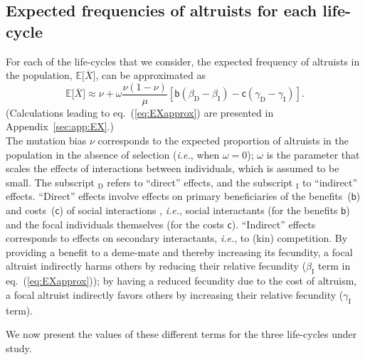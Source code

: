 \documentclass[11pt, letterpaper]{article}
\renewcommand{\eqref}[1]{\textup{{\normalfont eq.~(\ref{#1}}\normalfont)}}
\newcommand{\ie}{\textit{i.e.}}
\newcommand{\Esp}[1]{\mathbb{E}\big[ #1\big]}%
\newcommand{\appname}[0]{Appendix}
\newcommand{\bb}{\mathsf{b}}
\newcommand{\cc}{\mathsf{c}}
\newcommand{\direct}{\mathrm{D}}
\newcommand{\indirect}{\mathrm{I}}
\newcommand{\mutbias}{\nu}
\begin{document}
\clearpage
\subsection{Expected frequencies of altruists for each life-cycle}

For each of the life-cycles that we consider, the expected frequency of altruists in the population, $\Esp{\overline{X}}$, can be approximated as
\begin{equation}\label{eq:EXapprox}
\Esp{\overline{X}} \approx \mutbias + \omega \frac{\mutbias (1-\mutbias)}{\mu} \left[ \bb \left( \beta_{\direct} - \beta_{\indirect} \right) - \cc \left( \gamma_{\direct} - \gamma_{\indirect} \right) \right].
\end{equation}
(Calculations leading to \eqref{eq:EXapprox} are presented in  \appname~\ref{sec:app:EX}.)\\
The mutation bias $\mutbias$ corresponds to the expected proportion of altruists in the population in the absence of selection (\ie, when $\omega = 0$); $\omega$ is the parameter that scales the effects of interactions between individuals, which is assumed to be small. The subscript $_{\direct}$ refers to ``direct'' effects, and the subscript $_{\indirect}$ to ``indirect'' effects. ``Direct'' effects involve effects on primary beneficiaries of the benefits~($\bb$) and costs~($\cc$) of social interactions \citep{WestGardner2010}, \ie, social interactants (for the benefits $\bb$) and the focal individuals themselves (for the costs $\cc$). ``Indirect'' effects corresponds to effects on secondary interactants, \ie, to (kin) competition. By providing a benefit to a deme-mate and thereby increasing its fecundity, a focal altruist indirectly harms others by reducing their relative fecundity ($\beta_{\indirect}$ term in \eqref{eq:EXapprox}); by having a reduced fecundity due to the cost of altruism, a focal altruist indirectly favors others by increasing their relative fecundity ($\gamma_{\indirect}$ term).

We now present the values of these different terms for the three life-cycles under study.  
\end{document}
